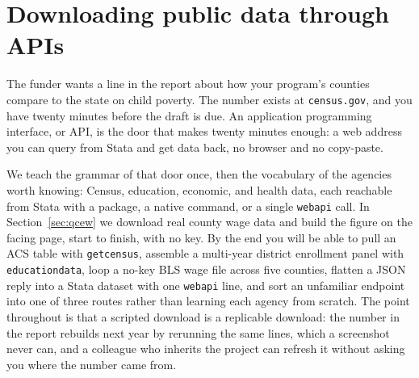 \documentclass[
    a4paper,
    fontsize=10pt,
    twoside=true,
    numbers=noenddot,
]{kaobook}
\begin{document}
\chapter{Downloading public data through APIs}\label{ch:apis}

The funder wants a line in the report about how your program's counties compare to the state on child poverty. The number exists at \texttt{census.gov}, and you have twenty minutes before the draft is due. An application programming interface, or API, is the door that makes twenty minutes enough: a web address you can query from Stata and get data back, no browser and no copy-paste.

We teach the grammar of that door once, then the vocabulary of the agencies worth knowing: Census, education, economic, and health data, each reachable from Stata with a package, a native command, or a single \texttt{webapi} call. In Section~\ref{sec:qcew} we download real county wage data and build the figure on the facing page, start to finish, with no key. By the end you will be able to pull an ACS table with \texttt{getcensus}, assemble a multi-year district enrollment panel with \texttt{educationdata}, loop a no-key BLS wage file across five counties, flatten a JSON reply into a Stata dataset with one \texttt{webapi} line, and sort an unfamiliar endpoint into one of three routes rather than learning each agency from scratch. The point throughout is that a scripted download is a replicable download: the number in the report rebuilds next year by rerunning the same lines, which a screenshot never can, and a colleague who inherits the project can refresh it without asking you where the number came from.
\end{document}

